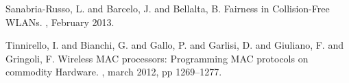 \documentclass[portrait,a0paper]{baposter}
\begin{document}
\begin{poster}
{{\begin{thebibliography}{1}
Sanabria-Russo, L. and Barcelo, J. and Bellalta, B.
\newblock Fairness in Collision-Free WLANs.
 , February 2013.

Tinnirello, I. and Bianchi, G. and Gallo, P. and Garlisi, D. and Giuliano, F. and Gringoli, F.
\newblock Wireless MAC processors: Programming MAC protocols on commodity Hardware.
 , march 2012, pp 1269--1277.

\end{thebibliography}
}

}

\end{poster}
\end{document}
